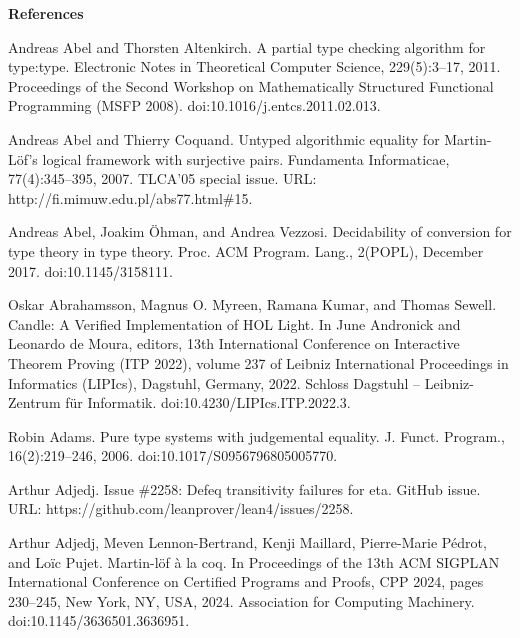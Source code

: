 
 
\par\medskip\noindent\textbf{References}\par
  
\par\noindent  [1]  Andreas Abel and Thorsten Altenkirch.  A partial type checking algorithm for type:type.  Electronic Notes in Theoretical Computer Science, 229(5):3–17, 2011.  Proceedings of the Second Workshop on Mathematically Structured Functional Programming (MSFP 2008).  doi:10.1016/j.entcs.2011.02.013.  
 
\par\noindent  [2]  Andreas Abel and Thierry Coquand.  Untyped algorithmic equality for Martin-Löf’s logical framework with surjective pairs.  Fundamenta Informaticae, 77(4):345–395, 2007.  TLCA’05 special issue.  URL: http://fi.mimuw.edu.pl/abs77.html\#15.  
 
\par\noindent  [3]  Andreas Abel, Joakim Öhman, and Andrea Vezzosi.  Decidability of conversion for type theory in type theory.  Proc. ACM Program. Lang., 2(POPL), December 2017.  doi:10.1145/3158111.  
 
\par\noindent  [4]  Oskar Abrahamsson, Magnus O. Myreen, Ramana Kumar, and Thomas Sewell.  Candle: A Verified Implementation of HOL Light.  In June Andronick and Leonardo de Moura, editors, 13th International Conference on Interactive Theorem Proving (ITP 2022), volume 237 of Leibniz International Proceedings in Informatics (LIPIcs), Dagstuhl, Germany, 2022. Schloss Dagstuhl – Leibniz-Zentrum für Informatik.  doi:10.4230/LIPIcs.ITP.2022.3.  
 
\par\noindent  [5]  Robin Adams.  Pure type systems with judgemental equality.  J. Funct. Program., 16(2):219–246, 2006.  doi:10.1017/S0956796805005770.  
 
\par\noindent  [6]  Arthur Adjedj.  Issue \#2258: Defeq transitivity failures for eta.  GitHub issue.  URL: https://github.com/leanprover/lean4/issues/2258.  
 
\par\noindent  [7]  Arthur Adjedj, Meven Lennon-Bertrand, Kenji Maillard, Pierre-Marie Pédrot, and Loïc Pujet.  Martin-löf à la coq.  In Proceedings of the 13th ACM SIGPLAN International Conference on Certified Programs and Proofs, CPP 2024, pages 230–245, New York, NY, USA, 2024. Association for Computing Machinery.  doi:10.1145/3636501.3636951.  
 
